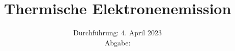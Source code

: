 

\subject{\texorpdfstring{\vspace{2ex}}{}V504\texorpdfstring{\vspace{-2ex}}{}} %
\title{Thermische Elektronenemission} %
\date{
	Durchführung: 4. April 2023 %
	\\ Abgabe:%
}

\robustify\bfseries




\maketitle
\thispagestyle{empty}


\tableofcontents
\newpage







\printbibliography{}

\newpage



